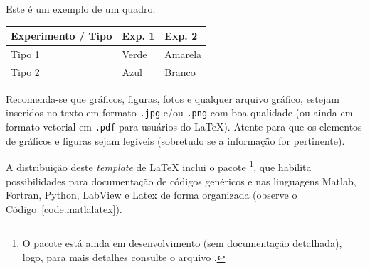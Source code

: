 \documentclass[12pt, a4paper, twoside, twocolumn]{article}
\begin{document}
\begin{quadro}[ht!]
  \centering {} \setlength\aboverulesep{0pt} \setlength\belowrulesep{0pt}
  \caption{Este é um exemplo de um quadro.}
	\fontsize{11}{12}\selectfont 
    \begin{tabular}{| C{2.8cm} | C{1.8cm} | C{1.8cm} |}
    \hline
    \textbf{ Experimento / Tipo } & \textbf{Exp. 1} & \textbf{Exp. 2}\\
	\midrule
		Tipo 1& Verde & Amarela\\
		 Tipo 2 & Azul & Branco\\
		\hline
    \end{tabular}
    \label{quad.exemplo}%
\end{quadro}%



Recomenda-se que gráficos, figuras, fotos e qualquer arquivo gráfico, estejam inseridos no texto em formato \!\texttt{.jpg} e/ou \texttt{.png} com boa qualidade (ou ainda em formato vetorial em \texttt{.pdf} para usuários do \LaTeX\xspace). Atente para que os elementos de gráficos e figuras sejam legíveis (sobretudo se a informação for pertinente).

A distribuição deste \textit{template} de \LaTeX\xspace inclui o pacote \footnote{O pacote está ainda em desenvolvimento (sem documentação detalhada), logo, para mais detalhes consulte o arquivo .}, que habilita possibilidades para documentação de códigos genéricos e nas linguagens Matlab, Fortran, Python, LabView e Latex de forma organizada (observe o Código~\ref{code.matlalatex}).
\end{document}
